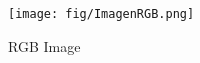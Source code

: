 \begin{figure}[htbp]
	\centering
		\texttt{[image: fig/ImagenRGB.png]}
	\caption{RGB Image}
	\label{fig:ImagenRGB}
\end{figure}



	
	
	
	


